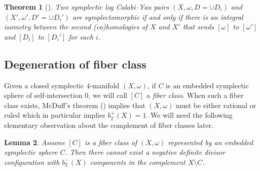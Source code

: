 \documentclass[11pt]{article}
\newtheorem{theorem}{Theorem}[section]
\newtheorem{lemma}[theorem]{Lemma}
\theoremstyle{definition}
\theoremstyle{remark}
\begin{document}
\begin{theorem}[\cite{Limak,LMN22}]\label{thm:LCYtorelli}
  Two symplectic log Calabi--Yau pairs $(X,\omega,D=\cup D_i)$ and $(X',\omega',D'=\cup D_i')$ are symplectomorphic if and only if there is an integral isometry between the second (co)homologies of $X$ and $X'$ that sends $[\omega]$ to $[\omega']$ and $[D_i]$ to $[D_i']$ for each $i$.
\end{theorem}




\subsection{Degeneration of fiber class}\label{section:degfiberclass}

Given a closed symplectic $4$-manifold $(X,\omega)$, if $C$ is an embedded symplectic sphere of self-intersection $0$, we will call $[C]$ a \emph{fiber class}. When such a fiber class exists, McDuff's theorem (\cite{Mcduffrationalruled}) implies that $(X,\omega)$ must be either rational or ruled which in particular implies $b_2^+(X)=1$. We will need the following elementary observation about the complement of fiber classes later.

\begin{lemma}\label{lem:fibercomplement}
  Assume $[C]$ is a fiber class of $(X,\omega)$ represented by an embedded symplectic sphere $C$. Then there cannot exist a negative definite divisor configuration with $b_2^-(X)$ components in the complement  $X\setminus C$. 
\end{lemma}
\end{document}
